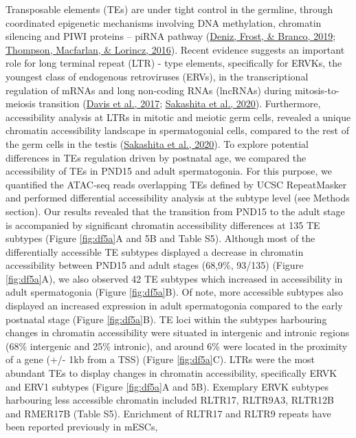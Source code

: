 \documentclass[12pt,twoside]{reedthesis}
\begin{document}
Transposable elements (TEs) are under tight control in the germline,
through coordinated epigenetic mechanisms involving DNA methylation,
chromatin silencing and PIWI proteins -- piRNA pathway (\protect\hyperlink{ref-deniz2019}{Deniz, Frost, \& Branco, 2019}; \protect\hyperlink{ref-thompson2016}{Thompson, Macfarlan, \& Lorincz, 2016}). Recent evidence suggests an important role for long
terminal repeat (LTR) - type elements, specifically for ERVKs, the
youngest class of endogenous retroviruses (ERVs), in the transcriptional
regulation of mRNAs and long non-coding RNAs (lncRNAs) during
mitosis-to-meiosis transition (\protect\hyperlink{ref-davis2017}{Davis et al., 2017}; \protect\hyperlink{ref-sakashita2020}{Sakashita et al., 2020}). Furthermore,
accessibility analysis at LTRs in mitotic and meiotic germ cells,
revealed a unique chromatin accessibility landscape in spermatogonial
cells, compared to the rest of the germ cells in the testis
(\protect\hyperlink{ref-sakashita2020}{Sakashita et al., 2020}). To explore potential differences in TEs regulation
driven by postnatal age, we compared the accessibility of TEs in PND15
and adult spermatogonia. For this purpose, we quantified the ATAC-seq
reads overlapping TEs defined by UCSC RepeatMasker and performed
differential accessibility analysis at the subtype level (see Methods
section). Our results revealed that the transition from PND15 to the
adult stage is accompanied by significant chromatin accessibility
differences at 135 TE subtypes (Figure \ref{fig:df5a}A and 5B and Table S5). Although
most of the differentially accessible TE subtypes displayed a decrease
in chromatin accessibility between PND15 and adult stages (68,9\%,
93/135) (Figure \ref{fig:df5a}A), we also observed 42 TE subtypes which increased in
accessibility in adult spermatogonia (Figure \ref{fig:df5a}B). Of note, more accessible
subtypes also displayed an increased expression in adult spermatogonia
compared to the early postnatal stage (Figure \ref{fig:df5a}B). TE loci within the
subtypes harbouring changes in chromatin accessibility were situated in
intergenic and intronic regions (68\% intergenic and 25\% intronic), and
around 6\% were located in the proximity of a gene (+/- 1kb from a TSS)
(Figure \ref{fig:df5a}C). LTRs were the most abundant TEs to display changes in
chromatin accessibility, specifically ERVK and ERV1 subtypes (Figure \ref{fig:df5a}A
and 5B). Exemplary ERVK subtypes harbouring less accessible chromatin
included RLTR17, RLTR9A3, RLTR12B and RMER17B (Table S5). Enrichment of
RLTR17 and RLTR9 repeats have been reported previously in mESCs,
\end{document}
